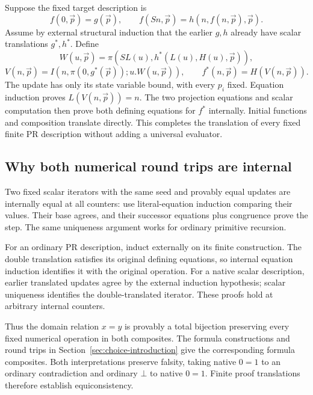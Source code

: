 \documentclass[11pt,letterpaper]{article}
\theoremstyle{definition}\newtheorem{definition}[theorem]{Definition}
\theoremstyle{remark}\newtheorem{remark}[theorem]{Remark}
\begin{document}
Suppose the fixed target description is
\[
 f(0,\vec p)=g(\vec p),\qquad
 f(Sn,\vec p)=h(n,f(n,\vec p),\vec p).
\]
Assume by external structural induction that the earlier $g,h$
already have scalar translations $g^*,h^*$. Define
\[
 W(u,\vec p)=\pi(SL(u),h^*(L(u),H(u),\vec p)),
\]
\[
 V(n,\vec p)=I(n,\pi(0,g^*(\vec p));u.W(u,\vec p)),
 \qquad f^*(n,\vec p)=H(V(n,\vec p)).
\]
The update has only its state variable bound, with every $p_i$
fixed. Equation induction proves $L(V(n,\vec p))=n$.
The two projection equations and scalar computation then prove
both defining equations for $f^*$ internally. Initial functions
and composition translate directly. This completes the translation
of every fixed finite PR description without adding a universal
evaluator.

\subsection{Why both numerical round trips are internal}

Two fixed scalar iterators with the same seed and provably equal
updates are internally equal at all counters: use literal-equation
induction comparing their values. Their base agrees, and their
successor equations plus congruence prove the step. The same
uniqueness argument works for ordinary primitive recursion.

For an ordinary PR description, induct externally on its finite
construction. The double translation satisfies its original
defining equations, so internal equation induction identifies it
with the original operation. For a native scalar description,
earlier translated updates agree by the external induction
hypothesis; scalar uniqueness identifies the double-translated
iterator. These proofs hold at arbitrary internal counters.

Thus the domain relation $x=y$ is provably a total bijection
preserving every fixed numerical operation in both composites.
The formula constructions and round trips in
Section~\ref{sec:choice-introduction} give the corresponding formula
composites. Both interpretations preserve falsity, taking native
$0=1$ to an ordinary contradiction and ordinary $\bot$ to native
$0=1$. Finite proof translations therefore establish equiconsistency.
\end{document}
